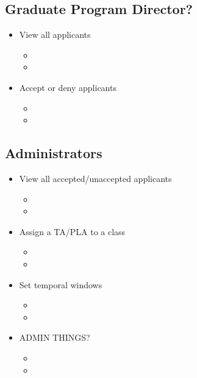 \documentclass[11pt]{amsart}
\begin{document}
\subsection{Graduate Program Director?}

\begin{itemize}
	\item{View all applicants}
	\begin{itemize}
		\item{}
		\item{}
	\end{itemize}
	\item{Accept or deny applicants}
	\begin{itemize}
		\item{}
		\item{}
	\end{itemize}
\end{itemize}

\subsection{Administrators}

\begin{itemize}
	\item{View all accepted/unaccepted applicants}
	\begin{itemize}
		\item{}
		\item{}
	\end{itemize}
	\item{Assign a TA/PLA to a class}
	\begin{itemize}
		\item{}
		\item{}
	\end{itemize}
	\item{Set temporal windows}
	\begin{itemize}
		\item{}
		\item{}
	\end{itemize}
	\item{ADMIN THINGS?}
	\begin{itemize}
		\item{}
		\item{}
	\end{itemize}
\end{itemize}
\end{document}
